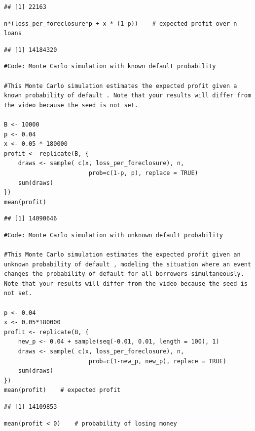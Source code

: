 \documentclass[
]{article}
\begin{document}
\begin{verbatim}
## [1] 22163
\end{verbatim}

\begin{verbatim}
n*(loss_per_foreclosure*p + x * (1-p))    # expected profit over n loans
\end{verbatim}

\begin{verbatim}
## [1] 14184320
\end{verbatim}

\begin{verbatim}
#Code: Monte Carlo simulation with known default probability

#This Monte Carlo simulation estimates the expected profit given a known probability of default . Note that your results will differ from the video because the seed is not set.

B <- 10000
p <- 0.04
x <- 0.05 * 180000
profit <- replicate(B, {
    draws <- sample( c(x, loss_per_foreclosure), n, 
                        prob=c(1-p, p), replace = TRUE) 
    sum(draws)
})
mean(profit)
\end{verbatim}

\begin{verbatim}
## [1] 14090646
\end{verbatim}

\begin{verbatim}
#Code: Monte Carlo simulation with unknown default probability

#This Monte Carlo simulation estimates the expected profit given an unknown probability of default , modeling the situation where an event changes the probability of default for all borrowers simultaneously. Note that your results will differ from the video because the seed is not set.

p <- 0.04
x <- 0.05*180000
profit <- replicate(B, {
    new_p <- 0.04 + sample(seq(-0.01, 0.01, length = 100), 1)
    draws <- sample( c(x, loss_per_foreclosure), n, 
                        prob=c(1-new_p, new_p), replace = TRUE) 
    sum(draws)
})
mean(profit)    # expected profit
\end{verbatim}

\begin{verbatim}
## [1] 14109853
\end{verbatim}

\begin{verbatim}
mean(profit < 0)    # probability of losing money
\end{verbatim}
\end{document}
